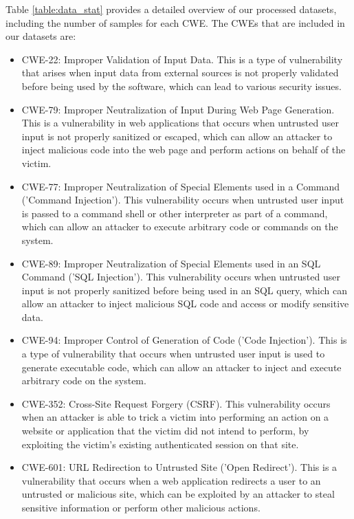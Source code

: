 \documentclass{ieeeaccess}
\begin{document}
\par Table \ref{table:data_stat} provides a detailed overview of our processed datasets, including the number of samples for each CWE. The CWEs that are included in our datasets are: 
\begin{itemize}
    \item CWE-22\cite{cwe22}: Improper Validation of Input Data. This is a type of vulnerability that arises when input data from external sources is not properly validated before being used by the software, which can lead to various security issues.
    \item CWE-79\cite{cwe79}: Improper Neutralization of Input During Web Page Generation. This is a vulnerability in web applications that occurs when untrusted user input is not properly sanitized or escaped, which can allow an attacker to inject malicious code into the web page and perform actions on behalf of the victim.
    \item CWE-77\cite{CWE-77}: Improper Neutralization of Special Elements used in a Command ('Command Injection'). This vulnerability occurs when untrusted user input is passed to a command shell or other interpreter as part of a command, which can allow an attacker to execute arbitrary code or commands on the system.
    \item CWE-89\cite{CWE-89}:  Improper Neutralization of Special Elements used in an SQL Command ('SQL Injection'). This vulnerability occurs when untrusted user input is not properly sanitized before being used in an SQL query, which can allow an attacker to inject malicious SQL code and access or modify sensitive data.
    \item CWE-94\cite{cwe94}:  Improper Control of Generation of Code ('Code Injection'). This is a type of vulnerability that occurs when untrusted user input is used to generate executable code, which can allow an attacker to inject and execute arbitrary code on the system.
    \item     CWE-352\cite{cwe352}: Cross-Site Request Forgery (CSRF). This vulnerability occurs when an attacker is able to trick a victim into performing an action on a website or application that the victim did not intend to perform, by exploiting the victim's existing authenticated session on that site.
    \item     CWE-601\cite{cwe601}:  URL Redirection to Untrusted Site ('Open Redirect'). This is a vulnerability that occurs when a web application redirects a user to an untrusted or malicious site, which can be exploited by an attacker to steal sensitive information or perform other malicious actions.
\end{itemize}
\end{document}

